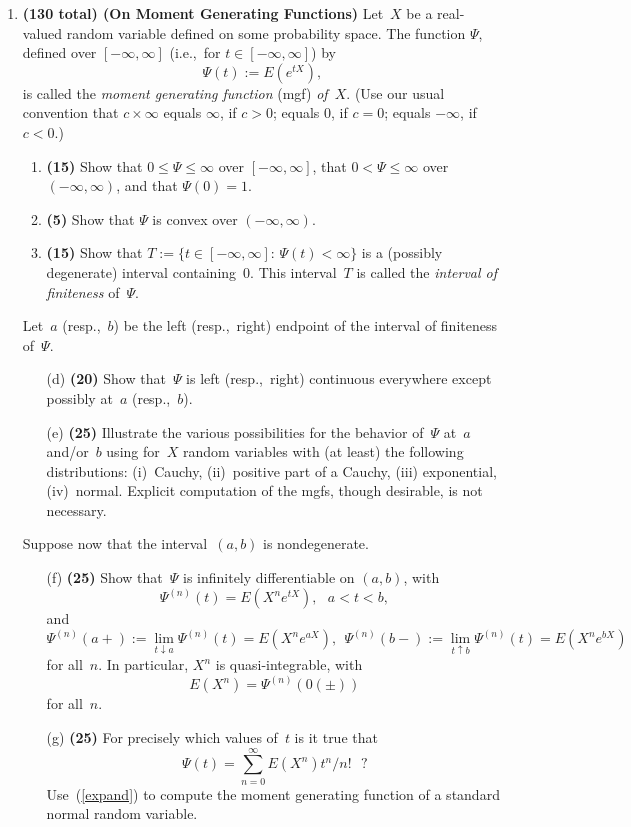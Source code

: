 \documentclass[letterpaper, 12pt]{article}
\begin{document}
\begin{enumerate}
\item {\bf (130 total) (On Moment Generating Functions)}
Let~$X$ be a real-valued random variable defined on some probability space.  The
function $\Psi$, defined over $[-\infty,\infty]$ (i.e.,\ for $t \in
[-\infty,\infty]$) by
$$
\Psi(t) := E \left( e^{tX} \right),
$$
is called the {\em moment generating function\/} (mgf) {\em of~$X$\/}.  (Use our
usual convention that $c \times \infty$ equals $\infty$, if $c > 0$; equals $0$,
if $c = 0$; equals $-\infty$, if $c < 0$.)
 \begin{enumerate}
\item {\bf (15)} Show that $0 \leq \Psi \leq \infty$ over $[-\infty,\infty]$,
that $0 < \Psi \leq \infty$ over $(-\infty,\infty)$, and that $\Psi(0) = 1$.
\item {\bf (5)} Show that $\Psi$ is convex over $(-\infty,\infty)$.
\item {\bf (15)} Show that $T := \{t \in [-\infty,\infty]:\,\Psi(t) < \infty\}$
is a (possibly degenerate) interval containing~$0$.  This interval~$T$ is called
the {\em interval of finiteness\/} of~$\Psi$.
 \end{enumerate}
Let~$a$ (resp.,~$b$) be the left (resp.,\ right) endpoint of the interval of
finiteness of~$\Psi$.
 \begin{enumerate}
\item[(d)] {\bf (20)} Show that~$\Psi$ is left (resp.,\ right) continuous
everywhere except possibly at~$a$ (resp.,~$b$).
\item[(e)] {\bf (25)} Illustrate the various possibilities for the behavior
of~$\Psi$ at~$a$ and/or~$b$ using for~$X$ random variables with (at least) the
following distributions: (i)~Cauchy, (ii)~positive part of a Cauchy, (iii)
exponential, (iv)~normal.  Explicit computation of the mgfs, though desirable,
is not necessary.
 \end{enumerate}
Suppose now that the interval~$(a,b)$ is nondegenerate.
 \begin{enumerate}
\item[(f)] {\bf (25)} Show that~$\Psi$ is infinitely differentiable on $(a,b)$,
with
$$
\Psi^{(n)}(t) = E \left( X^n e^{tX} \right),\ \ \ a < t < b,
$$
and
$$
\Psi^{(n)}(a+) := \lim_{t \downarrow a} \Psi^{(n)}(t) = E \left( X^n e^{aX}
\right),\ \ 
\Psi^{(n)}(b-) := \lim_{t \uparrow b} \Psi^{(n)}(t) = E \left( X^n e^{bX}
\right)
$$
for all~$n$.  In particular, $X^n$ is quasi-integrable, with
$$
E \left( X^n \right) = \Psi^{(n)}(0(\pm))
$$
for all~$n$.
\item[(g)] {\bf (25)} For precisely which values of~$t$ is it true that
\begin{equation}
\label{expand}
\Psi(t) = \sum_{n=0}^{\infty} E \left( X^n \right) t^n / n!\ \ \ \mbox{?}
\end{equation}
Use~(\ref{expand}) to compute the moment generating function of a standard
normal random variable.
 \end{enumerate}
\end{enumerate}
\end{document}
